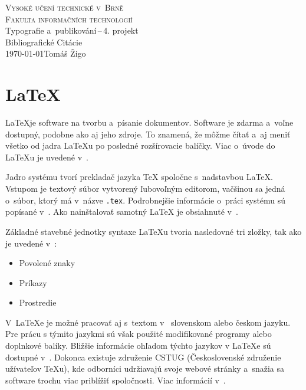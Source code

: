 \documentclass[a4paper, 11pt]{article}
\begin{document}
\begin{titlepage}
\begin{center}
\textsc{\Huge Vysoké učení technické v~Brně}\\
\textsc{\huge Fakulta informačních technologií}\\
\LARGE Typografie a~publikování\,--\,4. projekt\\
\Huge Bibliografické Citácie\\
\Large \today \hfill Tomáš Žigo  \newpage
\end{center}
\end{titlepage}

\section{\LaTeX}

\LaTeX je software na tvorbu a~písanie dokumentov. Software je zdarma a~voľne dostupný, podobne ako aj jeho zdroje. To znamená, že môžme čítať a~aj meniť všetko od jadra {\LaTeX}u po posledné rozšírovacie balíčky. Viac o~úvode do {\LaTeX}u je uvedené v~\cite{KottwitzStefan}.

Jadro systému tvorí prekladač jazyka {\TeX} spoločne s~nadstavbou {\LaTeX}. Vstupom je textový súbor vytvorený ľubovoľným editorom, vačšinou sa jedná o~súbor, ktorý má v~názve \texttt{.tex}. Podrobnejšie informácie o~práci systému sú popísané v~\cite{RybickaJiri}. Ako nainštalovať samotný {\LaTeX} je obsiahnuté v~\cite{BojkoPavel}.

Základné stavebné jednotky syntaxe {\LaTeX}u tvoria nasledovné tri zložky, tak ako je uvedené v~\cite{VavricekJan}:
\begin{itemize}
\item Povolené znaky
\item Príkazy
\item Prostredie
\end{itemize}	

V~{\LaTeX}e je možné pracovať aj s~textom v ~slovenskom alebo českom jazyku. Pre prácu s týmito jazykmi sú však použité modifikované programy alebo doplnkové balíky. Bližšie informácie ohľadom týchto jazykov v {\LaTeX}e sú dostupné v~\cite{MartinekDavid}. Dokonca existuje združenie CSTUG (Československé združenie užívateľov {\TeX}u), kde odborníci udržiavajú svoje webové stránky a~snažia sa software trochu viac priblížiť spoločnosti. Viac informácií v~\cite{VeselyJindrich}.
\end{document}
